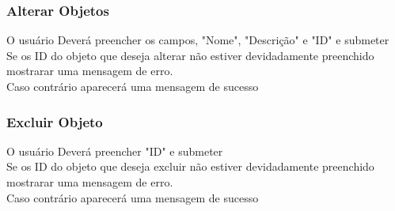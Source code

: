 \documentclass[a4paper]{article}
\begin{document}
    \subsubsection{Alterar Objetos}
    O usuário Deverá preencher os campos, "Nome", "Descrição" e "ID" e submeter\\
    Se os ID do objeto que deseja alterar não estiver devidadamente preenchido mostrarar uma mensagem de erro.\\
    Caso contrário aparecerá uma mensagem de sucesso\\

    \subsubsection{Excluir Objeto}
    O usuário Deverá preencher "ID" e submeter\\
    Se os ID do objeto que deseja excluir não estiver devidadamente preenchido mostrarar uma mensagem de erro.\\
    Caso contrário aparecerá uma mensagem de sucesso\\
  
  
\end{document}
